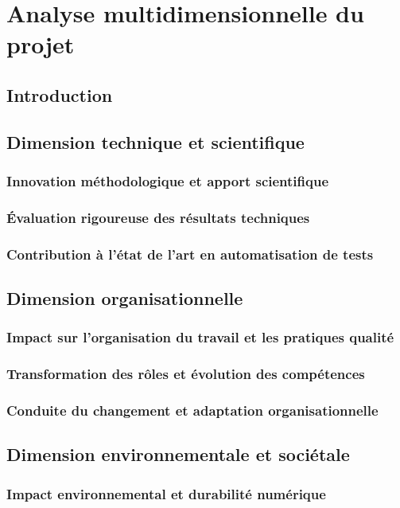 \chapter{Analyse multidimensionnelle du projet}

\section{Introduction}

\section{Dimension technique et scientifique}
\subsection{Innovation méthodologique et apport scientifique}
\subsection{Évaluation rigoureuse des résultats techniques}
\subsection{Contribution à l'état de l'art en automatisation de tests}

\section{Dimension organisationnelle}
\subsection{Impact sur l'organisation du travail et les pratiques qualité}
\subsection{Transformation des rôles et évolution des compétences}
\subsection{Conduite du changement et adaptation organisationnelle}

\section{Dimension environnementale et sociétale}
\subsection{Impact environnemental et durabilité numérique}
